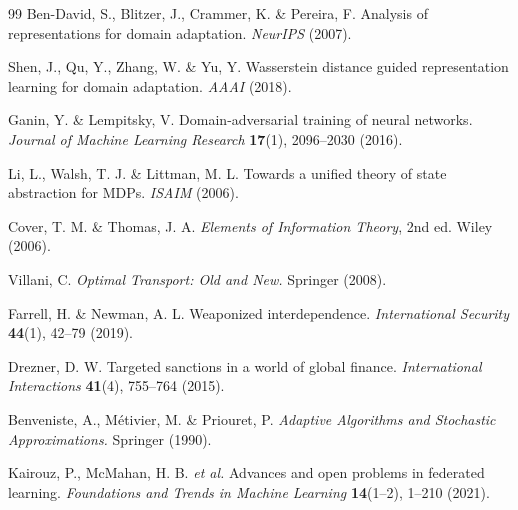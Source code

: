 \documentclass[twocolumn]{article}
\theoremstyle{definition}
\begin{document}
\begin{thebibliography}{99}
Ben-David, S., Blitzer, J., Crammer, K. \& Pereira, F. Analysis of representations for domain adaptation. \emph{NeurIPS} (2007).

Shen, J., Qu, Y., Zhang, W. \& Yu, Y. Wasserstein distance guided representation learning for domain adaptation. \emph{AAAI} (2018).

Ganin, Y. \& Lempitsky, V. Domain-adversarial training of neural networks. \emph{Journal of Machine Learning Research} \textbf{17}(1), 2096--2030 (2016).

Li, L., Walsh, T. J. \& Littman, M. L. Towards a unified theory of state abstraction for MDPs. \emph{ISAIM} (2006).

Cover, T. M. \& Thomas, J. A. \emph{Elements of Information Theory}, 2nd ed. Wiley (2006).

Villani, C. \emph{Optimal Transport: Old and New.} Springer (2008).

Farrell, H. \& Newman, A. L. Weaponized interdependence. \emph{International Security} \textbf{44}(1), 42--79 (2019).

Drezner, D. W. Targeted sanctions in a world of global finance. \emph{International Interactions} \textbf{41}(4), 755--764 (2015).

Benveniste, A., M\'{e}tivier, M. \& Priouret, P. \emph{Adaptive Algorithms and Stochastic Approximations.} Springer (1990).

Kairouz, P., McMahan, H. B. \emph{et al.} Advances and open problems in federated learning. \emph{Foundations and Trends in Machine Learning} \textbf{14}(1--2), 1--210 (2021).

\end{thebibliography}
\end{document}
